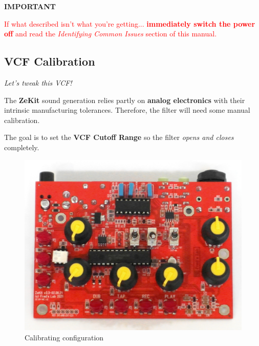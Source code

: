 \documentclass{scrartcl}
\begin{document}
\vspace{0.5cm}
\textbf{IMPORTANT}

\begin{tcolorbox}
    \textcolor{red}{
        If what described isn't what you're getting... \textbf{immediately switch the power off} and read the \emph{Identifying Common Issues} section of this manual.
    }
\end{tcolorbox}

\pagebreak
\subsection{VCF Calibration}

\Large
\emph{Let's tweak this VCF!}
\normalsize

The \textbf{ZeKit} sound generation relies partly on \textbf{analog electronics} with their intrinsic manufacturing tolerances. Therefore, the filter will need some manual calibration.

The goal is to set the \textbf{VCF Cutoff Range} so the filter \emph{opens and closes} completely.

\begin{figure}[!ht]
    \begin{center}
        \includegraphics[scale=0.30]{assets/zekit-calibrate.jpg}
        \caption{Calibrating configuration}
    \end{center}
\end{figure}
\end{document}
